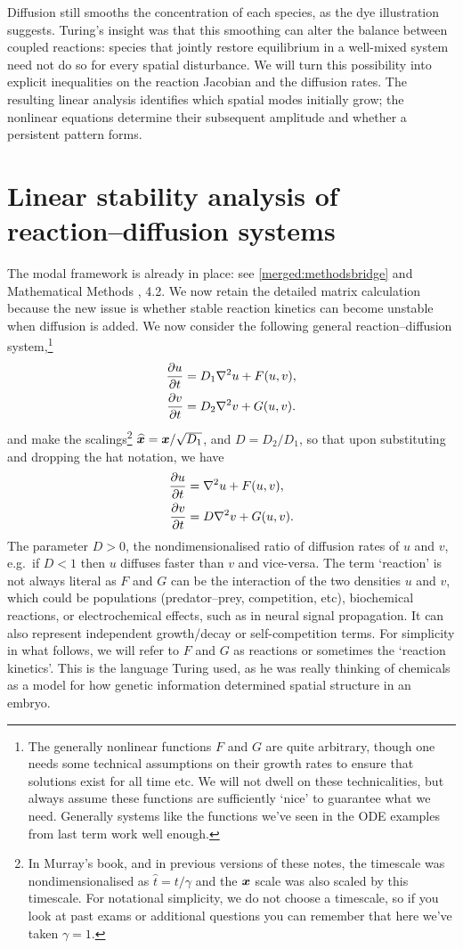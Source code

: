 \documentclass[main.tex]{subfiles}
\begin{document}
Diffusion still smooths the concentration of each species, as the dye illustration suggests. Turing's insight was that this smoothing can alter the balance between coupled reactions: species that jointly restore equilibrium in a well-mixed system need not do so for every spatial disturbance. We will turn this possibility into explicit inequalities on the reaction Jacobian and the diffusion rates. The resulting linear analysis identifies which spatial modes initially grow; the nonlinear equations determine their subsequent amplitude and whether a persistent pattern forms.

\section{Linear stability analysis of reaction--diffusion systems}
The modal framework is already in place: see \cref{merged:methodsbridge} and Mathematical Methods , 4.2. We now retain the detailed matrix calculation because the new issue is whether stable reaction kinetics can become unstable when diffusion is added.
We now consider the following general reaction--diffusion system,\footnote{The generally nonlinear functions $F$ and $G$ are quite arbitrary, though one needs some technical assumptions on their growth rates to ensure that solutions exist for all time etc. We will not dwell on these technicalities, but always assume these functions are sufficiently `nice' to guarantee what we need. Generally systems like the functions we've seen in the ODE examples from last term work well enough.} 
\begin{align}
\pd{u}{t} &= D_1\nabla^2u + F(u,v),\\
\pd{v}{t} &= D_2\nabla^2v + G(u,v).
\end{align}
and make the scalings\footnote{In Murray's book, and in previous versions of these notes, the timescale was nondimensionalised as $\hat{t} = t/\gamma$ and the $\v{x}$ scale was also scaled by this timescale. For notational simplicity, we do not choose a timescale, so if you look at past exams or additional questions you can remember that here we've taken $\gamma=1$.} $\hat{\v{x}} =\v{x}/\sqrt{D_1}$, and $D = D_2/D_1$, so that upon substituting and dropping the hat notation, we have
\begin{align}\label{RD_System}
\pd{u}{t} &= \nabla^2u +  F(u,v),\\
\pd{v}{t} &= D\nabla^2v +  G(u,v).
\end{align}
The parameter $D>0$, the nondimensionalised ratio of diffusion rates of $u$ and $v$, e.g.\ if $D<1$ then $u$ diffuses faster than $v$ and vice-versa.  The term `reaction' is not always literal as $F$ and $G$ can be the interaction of the two densities $u$ and $v$, which could be populations (predator--prey, competition, etc), biochemical reactions, or electrochemical effects, such as in neural signal propagation. It can also represent independent growth/decay or self-competition terms. For simplicity in what follows, we will refer to $F$ and $G$ as reactions or sometimes the `reaction kinetics'. This is the language Turing used, as he was really thinking of chemicals as a model for how genetic information determined spatial structure in an embryo.
\end{document}
